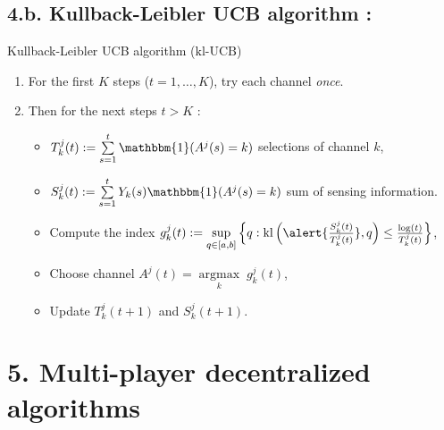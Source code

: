 \documentclass[12pt,english,ignorenonframetext,aspectratio=169,]{beamer}
\providecommand{\tightlist}{%
  \setlength{\itemsep}{0pt}\setlength{\parskip}{0pt}}
\begin{document}
\subsection{\hfill{}4.b. Kullback-Leibler UCB algorithm : \klUCB\hfill{}}

\begin{frame}{Kullback-Leibler UCB algorithm
(\(\mathrm{kl}\)-\(\mathrm{UCB}\))}

\begin{enumerate}
\def\labelenumi{\arabic{enumi}.}
\tightlist
\item
  For the first \(K\) steps (\(t=1,\dots,K\)), try each channel
  \emph{once}.
\item
  Then for the next steps \(t > K\) :

  \begin{itemize}
  \tightlist
  \item
  \(T_k^j(t) := \sum\limits_{s=1}^{t} \mathbbm{1}(A^j(s) = k)\) selections of channel \(k\),
  \item
  \(S_k^j(t) := \sum\limits_{s=1}^{t} Y_{k}(s) \mathbbm{1}(A^j(s) = k)\) sum of sensing information.
  \item
    Compute the index
    \(g_k^j(t) := \sup\limits_{q \in [a, b]} \left\{ q : \mathrm{kl}\left(\alert{\frac{S_k^j(t)}{T_k^j(t)}}, q\right) \leq \frac{\log(t)}{T_k^j(t)} \right\}\),
  \item
    Choose channel \(A^j(t) = \mathop{\arg\max}\limits_{k} \; g_k^j(t)\),
  \item
    Update \(T_k^j(t+1)\) and \(S_k^j(t+1)\).
  \end{itemize}
\end{enumerate}


\end{frame}



\section{\hfill{}5. Multi-player decentralized algorithms\hfill{}}
\end{document}

